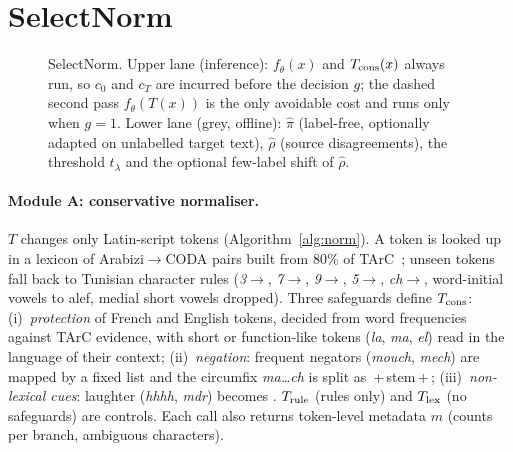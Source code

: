 \section{SelectNorm}
\label{sec:method}

\begin{figure}[t]
\centering

\caption{SelectNorm. Upper lane (inference): $f_\theta(x)$ and $T_{\rm cons}(x)$ always run, so $c_0$ and $c_T$ are incurred before the decision $g$; the dashed second pass $f_\theta(T(x))$ is the only avoidable cost and runs only when $g=1$. Lower lane (grey, offline): $\hat\pi$ (label-free, optionally adapted on unlabelled target text), $\hat\rho$ (source disagreements), the threshold $t_\lambda$ and the optional few-label shift of $\hat\rho$.}
\label{fig:arch}
\end{figure}

\paragraph{Module A: conservative normaliser.}
$T$ changes only Latin-script tokens (Algorithm~\ref{alg:norm}). A token is looked up in a lexicon of Arabizi$\to$CODA pairs built from 80\% of TArC~\cite{gugliotta2022tarc}; unseen tokens fall back to Tunisian character rules (\textit{3}$\to$, \textit{7}$\to$, \textit{9}$\to$, \textit{5}$\to$, \textit{ch}$\to$, word-initial vowels to alef, medial short vowels dropped). Three safeguards define $T_{\rm cons}$: (i)~\emph{protection} of French and English tokens, decided from word frequencies against TArC evidence, with short or function-like tokens (\textit{la}, \textit{ma}, \textit{el}) read in the language of their context; (ii)~\emph{negation}: frequent negators (\textit{mouch}, \textit{mech}) are mapped by a fixed list and the circumfix \textit{ma\ldots ch} is split as \,+\,stem\,+\,; (iii)~\emph{non-lexical cues}: laughter (\textit{hhhh}, \textit{mdr}) becomes . $T_{\rm rule}$ (rules only) and $T_{\rm lex}$ (no safeguards) are controls. Each call also returns token-level metadata $m$ (counts per branch, ambiguous characters).

